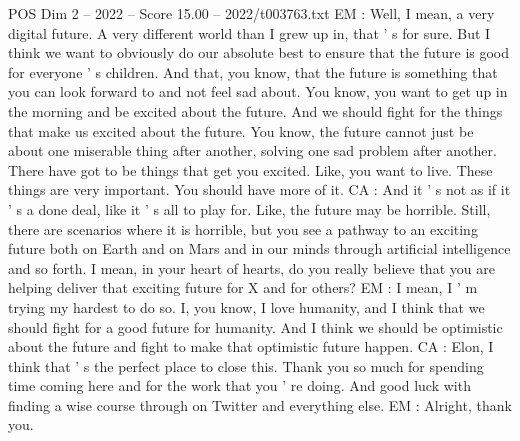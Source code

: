 \begin{textsample}{POS Dim 2 – 2022 – Score 15.00 – 2022/t003763.txt}
EM : Well, I mean, a very digital future.
A very different world than I grew up in, that ' s for sure.
But I think we want to obviously do our absolute best to ensure that the future is good for everyone ' s children.
And that, you know, that the future is something that you can look forward to and not feel sad about.
You know, you want to get up in the morning and be excited about the future.
And we should fight for the things that make us excited about the future.
You know, the future cannot just be about one miserable thing after another, solving one sad problem after another.
There have got to be things that get you excited.
Like, you want to live.
These things are very important.
You should have more of it.
CA : And it ' s not as if it ' s a done deal, like it ' s all to play for.
Like, the future may be horrible.
Still, there are scenarios where it is horrible, but you see a pathway to an exciting future both on Earth and on Mars and in our minds through artificial intelligence and so forth.
I mean, in your heart of hearts, do you really believe that you are helping deliver that exciting future for X and for others?
EM : I mean, I ' m trying my hardest to do so.
I, you know, I love humanity, and I think that we should fight for a good future for humanity.
And I think we should be optimistic about the future and fight to make that optimistic future happen.
CA : Elon, I think that ' s the perfect place to close this.
Thank you so much for spending time coming here and for the work that you ' re doing.
And good luck with finding a wise course through on Twitter and everything else.
EM : Alright, thank you.

\end{textsample}
